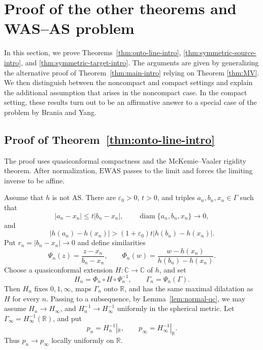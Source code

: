 \documentclass[10pt,a4paper]{amsart}
\numberwithin{equation}{section}
\newcommand{\R}{\mathbb{R}}
\newcommand{\C}{\mathbb{C}}
\newcommand{\diam}{\operatorname{diam}}
\begin{document}
\section{Proof of the other theorems and WAS--AS problem}\label{sec:proof_of_theorems_ref_thm_onto_line_intro}

In this section, we prove Theorems~\ref{thm:onto-line-intro}, \ref{thm:symmetric-source-intro}, and \ref{thm:symmetric-target-intro}.  
The arguments are given by generalizing the alternative proof of Theorem~\ref{thm:main-intro}
relying on Theorem \ref{thm:MV}.
We then distinguish between the noncompact and compact settings and explain the additional assumption that arises in the noncompact case. In the compact setting, these results turn out to be an affirmative answer to a special case of the problem by Brania and Yang.

\subsection{Proof of Theorem~\ref{thm:onto-line-intro}}

The proof uses quasiconformal compactness and the McKemie--Vaaler rigidity theorem. 
After normalization, $\mathrm{EWAS}$ passes to the limit and forces the limiting inverse to be affine.

\medskip

Assume that $h$ is not $\mathrm{AS}$. 
There are $\varepsilon_0>0$, $t>0$, and triples
$a_n,b_n,x_n\in\Gamma$ such that
\begin{equation}\label{eq:onto-failure-scale}
 |a_n-x_n|\leq t|b_n-x_n|, \qquad \diam\{a_n,b_n,x_n\}\to 0,
\end{equation}
and
\begin{equation}\label{eq:onto-failure-image}
 |h(a_n)-h(x_n)|>(1+\varepsilon_0)t|h(b_n)-h(x_n)|.
\end{equation}
Put $r_n=|b_n-x_n|\to0$ and define similarities
\[
 \Psi_n(z)=\frac{z-x_n}{b_n-x_n},
 \qquad
 \Phi_n(w)=\frac{w-h(x_n)}{h(b_n)-h(x_n)}.
\]
Choose a quasiconformal extension $H\colon\C\to\C$ of $h$, and set
\[
 H_n=\Phi_n\circ H\circ \Psi_n^{-1},\qquad\Gamma_n=\Psi_n(\Gamma).
\]
Then $H_n$ fixes $0,1,\infty$, maps $\Gamma_n$ onto $\R$, and has the same maximal dilatation as $H$ for every $n$. 
Passing to a subsequence, by Lemma~\ref{lem:normal-qc}, we may assume $H_n\to H_\infty$, and $H_n^{-1}\to H_\infty^{-1}$ 
uniformly in the spherical metric. 
Let $\Gamma_\infty=H_\infty^{-1}(\R)$, and put
\[
 p_n=H_n^{-1}|_{\R},\qquad  p_\infty=H_\infty^{-1}|_{\R}.
\]
Thus $p_n\to p_\infty$ locally uniformly on $\R$.
\end{document}
